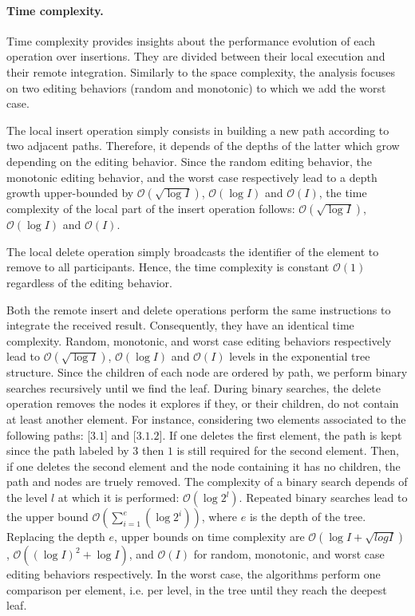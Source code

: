 \paragraph{Time complexity.}

Time complexity provides insights about the performance evolution of each
operation over insertions. They are divided between their local execution and
their remote integration.  Similarly to the space complexity, the analysis
focuses on two editing behaviors (random and monotonic) to which we add the
worst case.

The local insert operation simply consists in building a new path according to
two adjacent paths. Therefore, it depends of the depths of the latter which grow
depending on the editing behavior. Since the random editing behavior, the
monotonic editing behavior, and the worst case respectively lead to a depth
growth upper-bounded by $\mathcal{O}(\sqrt{\log I})$, $\mathcal{O}(\log I)$ and
$\mathcal{O}(I)$, the time complexity of the local part of the insert operation
follows: $\mathcal{O}(\sqrt{\log I})$, $\mathcal{O}(\log I)$ and
$\mathcal{O}(I)$.

The local delete operation simply broadcasts the identifier of the element to
remove to all participants. Hence, the time complexity is constant
$\mathcal{O}(1)$ regardless of the editing behavior.

Both the remote insert and delete operations perform the same instructions to
integrate the received result. Consequently, they have an identical time
complexity. Random, monotonic, and worst case editing behaviors respectively
lead to $\mathcal{O}(\sqrt{\log I})$, $\mathcal{O}(\log I)$ and $\mathcal{O}(I)$
levels in the exponential tree structure. Since the children of each node are
ordered by path, we perform binary searches recursively until we find the
leaf. During binary searches, the delete operation removes the nodes it explores
if they, or their children, do not contain at least another element. For
instance, considering two elements associated to the following paths: [$3.1$]
and [$3.1.2$]. If one deletes the first element, the path is kept since the path
labeled by $3$ then $1$ is still required for the second element. Then, if one
deletes the second element and the node containing it has no children, the path
and nodes are truely removed. The complexity of a binary search depends of the
level $l$ at which it is performed: $\mathcal{O}(\log 2^l)$. Repeated binary
searches lead to the upper bound
$\mathcal{O}(\textstyle\sum\nolimits_{i=1}^{e}(\log 2^i))$, where $e$ is the
depth of the tree. Replacing the depth $e$, upper bounds on time complexity are
$\mathcal{O}(\log I + \sqrt{log I})$, $\mathcal{O}((\log I)^2+\log I)$, and
$\mathcal{O}(I)$ for random, monotonic, and worst case editing behaviors
respectively. In the worst case, the algorithms perform one comparison per
element, i.e. per level, in the tree until they reach the deepest leaf.


